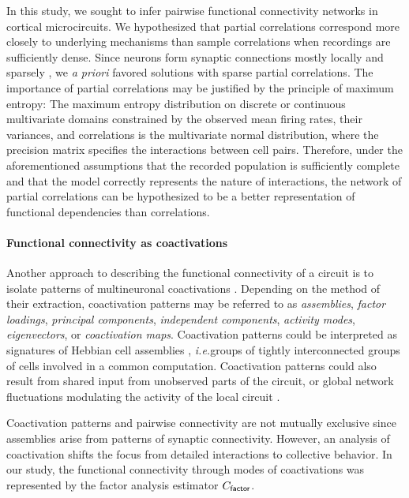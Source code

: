 \documentclass[10pt]{article}
\newcommand{\ie}{\emph{i.e.}\;}
\begin{document}
In this study, we sought to infer pairwise functional connectivity networks  in cortical microcircuits. We hypothesized that partial correlations correspond more closely to underlying mechanisms than sample correlations when recordings are sufficiently dense.  Since neurons form synaptic connections mostly locally and sparsely \cite{Perin:2011}, we \emph{a priori} favored solutions with sparse partial correlations.  The importance of partial correlations may be justified by the principle of maximum entropy: The maximum entropy distribution on discrete or continuous multivariate domains constrained by the observed mean firing rates, their variances, and correlations is the multivariate normal distribution, where the precision matrix specifies the interactions between cell pairs.  Therefore, under the aforementioned assumptions that the recorded population is sufficiently complete and that the model correctly represents the nature of interactions, the network of partial correlations can be hypothesized to be a better representation of functional dependencies than correlations. 

\paragraph{Functional connectivity as coactivations}
Another approach to describing the functional connectivity of a circuit is to isolate patterns of multineuronal coactivations \cite{Gerstein:1989, Chapin:1999, Peyrache:2010, Ch:2010, Lopes:2011, Lopes:2013}. Depending on the method of their extraction, coactivation patterns may be referred to as \emph{assemblies}, \emph{factor loadings}, \emph{principal components}, \emph{independent components}, \emph{activity modes}, \emph{eigenvectors}, or \emph{coactivation maps}. Coactivation patterns could be interpreted as signatures of Hebbian cell assemblies \cite{Gerstein:1989, Ch:2010}, \ie groups of tightly interconnected groups of cells involved in a common computation.  Coactivation patterns could also result from shared input from unobserved parts of the circuit, or global network fluctuations modulating the activity of the local circuit \cite{Okun:2012}.

Coactivation patterns and pairwise connectivity are not mutually exclusive since assemblies arise from patterns of synaptic connectivity.  However, an analysis of coactivation shifts the focus from detailed interactions to  collective behavior.  
In our study, the functional connectivity through modes of coactivations was represented by the factor analysis estimator $C_{\sf factor}$.  
\end{document}
